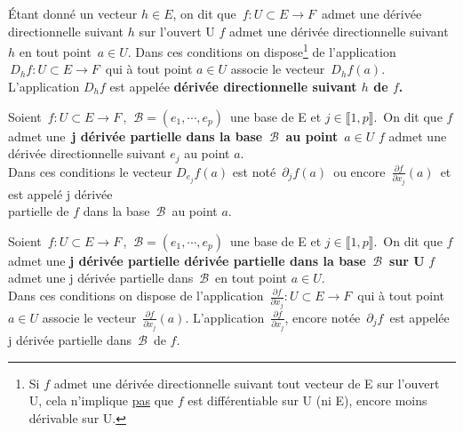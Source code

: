 Étant donné un vecteur \(h\in E\), on dit que \(\,f:U\subset E\to F\,\) admet une dérivée directionnelle suivant $h$ sur l'ouvert U \ssi $f$ admet une dérivée directionnelle suivant $h$ en tout point \(\,a\in U.\) Dans ces conditions on dispose\footnote{Si $f$ admet une dérivée directionnelle suivant tout vecteur de E sur l'ouvert U, cela n'implique \underline{pas} que $f$ est différentiable sur U (ni E), encore moins dérivable sur U.} de l'application \(\,D_hf:U\subset E\to F\,\) qui à tout point \(a\in U\) associe le vecteur \(\,D_hf(a)\). L'application \(D_hf\) est appelée \textbf{dérivée directionnelle suivant $h$ de $f$.}

\vspace{1cm}

\hspace*{0.8cm}Soient \(\,f:U\subset E\to F\,\), \(\ \mathcal{B}=(e_1,\cdots,e_p)\,\) une base de E et \(j\in \llbracket 1,p \rrbracket.\,\) On dit que $f$ admet une\, \textbf{j dérivée partielle dans la base \(\,\mathcal{B}\,\) au point} \(\,a\in U\) \ssi $f$ admet une dérivée directionnelle suivant $e_j$ au point $a$.\\Dans ces conditions le vecteur \(D_{e_j}f(a)\) est noté \(\,\partial_jf(a)\,\) ou encore \(\,\displaystyle \frac{\partial f}{\partial x_j}(a)\,\) et est appelé j dérivée\vspace{-0.1cm}\\
partielle de $f$ dans la base \(\,\mathcal{B}\,\) au point $a$.

\vspace{1cm}

Soient \(\,f:U\subset E\to F\,\), \(\ \mathcal{B}=(e_1,\cdots,e_p)\,\) une base de E et \(j\in \llbracket 1,p \rrbracket.\,\) On dit que $f$ admet une \textbf{j dérivée partielle dérivée partielle dans la base \(\,\mathcal{B}\,\) sur U} \ssi $f$ admet une j dérivée partielle dans \(\,\mathcal{B}\,\) en tout point \(a\in U\).\\
Dans ces conditions on dispose de l'application \(\, \displaystyle \frac{\partial f}{\partial x_j}:U\subset E \to F\,\) qui à tout point \(a\in U\) associe le vecteur \(\,\displaystyle \frac{\partial f}{\partial x_j}(a).\) L'application \(\, \displaystyle \frac{\partial f}{\partial x_j}\), encore notée \(\,\partial_j f\,\) est appelée j dérivée partielle dans \(\,\mathcal{B}\,\) de $f$.

